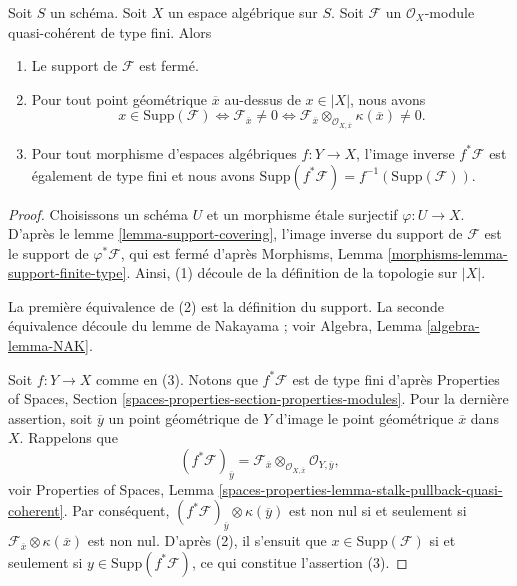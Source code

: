 \begin{lemma}
\label{lemma-support-finite-type}
Soit $S$ un schéma. Soit $X$ un espace algébrique sur $S$.
Soit $\mathcal{F}$ un $\mathcal{O}_X$-module quasi-cohérent de type fini.
Alors
\begin{enumerate}
\item Le support de $\mathcal{F}$ est fermé.
\item Pour tout point géométrique $\overline{x}$ au-dessus de $x \in |X|$, nous avons
$$
x \in \text{Supp}(\mathcal{F})
\Leftrightarrow
\mathcal{F}_{\overline{x}} \not = 0
\Leftrightarrow
\mathcal{F}_{\overline{x}} \otimes_{\mathcal{O}_{X, \overline{x}}}
\kappa(\overline{x}) \not = 0.
$$
\item Pour tout morphisme d'espaces algébriques $f : Y \to X$, l'image inverse
$f^*\mathcal{F}$ est également de type fini et nous avons
$\text{Supp}(f^*\mathcal{F}) = f^{-1}(\text{Supp}(\mathcal{F}))$.
\end{enumerate}
\end{lemma}

\begin{proof}
Choisissons un schéma $U$ et un morphisme étale surjectif $\varphi : U \to X$.
D'après le lemme \ref{lemma-support-covering}, l'image inverse du support de
$\mathcal{F}$ est le support de $\varphi^*\mathcal{F}$, qui est fermé d'après
Morphisms, Lemma \ref{morphisms-lemma-support-finite-type}.
Ainsi, (1) découle de la définition de la topologie sur $|X|$.

\medskip\noindent
La première équivalence de (2) est la définition du support.
La seconde équivalence découle du lemme de Nakayama ; voir
Algebra, Lemma \ref{algebra-lemma-NAK}.

\medskip\noindent
Soit $f : Y \to X$ comme en (3). Notons que $f^*\mathcal{F}$ est de type fini
d'après Properties of Spaces, Section
\ref{spaces-properties-section-properties-modules}.
Pour la dernière assertion, soit $\overline{y}$ un point géométrique de $Y$
d'image le point géométrique $\overline{x}$ dans $X$. Rappelons que
$$
(f^*\mathcal{F})_{\overline{y}} =
\mathcal{F}_{\overline{x}} \otimes_{\mathcal{O}_{X, \overline{x}}}
\mathcal{O}_{Y, \overline{y}},
$$
voir Properties of Spaces, Lemma
\ref{spaces-properties-lemma-stalk-pullback-quasi-coherent}.
Par conséquent, $(f^*\mathcal{F})_{\overline{y}} \otimes \kappa(\overline{y})$
est non nul si et seulement si
$\mathcal{F}_{\overline{x}} \otimes \kappa(\overline{x})$ est non nul.
D'après (2), il s'ensuit que $x \in \text{Supp}(\mathcal{F})$ si et seulement
si $y \in \text{Supp}(f^*\mathcal{F})$, ce qui constitue
l'assertion (3).
\end{proof}

